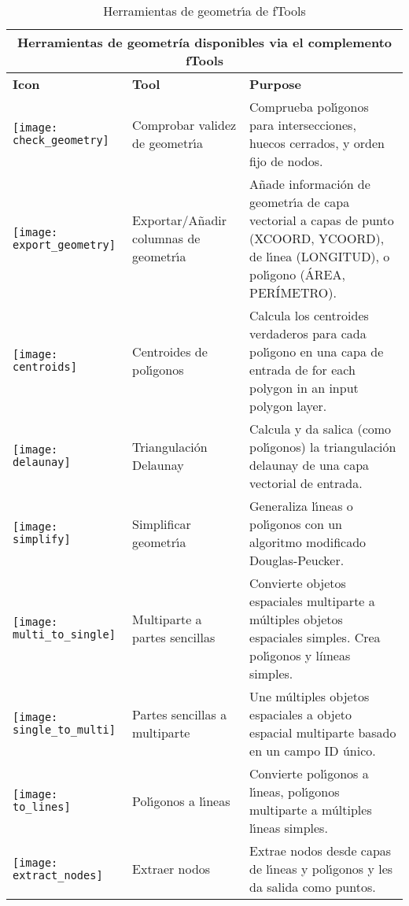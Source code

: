\begin{table}[ht]
\centering
\caption{Herramientas de geometr\'{\i}a de fTools}\label{tab:ftool_geometry}\medskip
 \begin{tabular}{|p{0.3in}|p{1.2in}|p{4.8in}|}
 \hline \multicolumn{3}{|c|}{\textbf{Herramientas de geometr\'ia disponibles via el complemento fTools}} \\
 \hline \textbf{Icon} & \textbf{Tool} & \textbf{Purpose} \\
 \hline \texttt{[image: check\_geometry]} & Comprobar validez de geometr\'{\i}a & 
Comprueba pol\'{\i}gonos para intersecciones, huecos cerrados, y orden fijo de nodos. \\
 \hline \texttt{[image: export\_geometry]} & Exportar/A\~nadir columnas de geometr\'{\i}a 
& A\~nade informaci\'on de geometr\'{\i}a de capa vectorial a capas de punto (XCOORD, YCOORD), 
de l\'{\i}nea (LONGITUD), o pol\'{\i}gono (\'AREA, PER\'IMETRO). \\
 \hline \texttt{[image: centroids]} & Centroides de pol\'{\i}gonos & 
Calcula los centroides verdaderos para cada pol\'{\i}gono en una capa de entrada de  for each polygon in an input polygon layer. \\
 \hline \texttt{[image: delaunay]} & Triangulaci\'on Delaunay & 
Calcula y da salica (como pol\'{\i}gonos) la triangulaci\'on delaunay de una capa vectorial de entrada. \\
 \hline \texttt{[image: simplify]} & Simplificar geometr\'{\i}a & 
Generaliza l\'{\i}neas o pol\'{\i}gonos con un algoritmo modificado Douglas-Peucker. \\
 \hline \texttt{[image: multi\_to\_single]} & Multiparte a 
partes sencillas & Convierte objetos espaciales multiparte a m\'ultiples objetos espaciales simples. 
Crea pol\'{\i}gonos y l\'i{\i}neas simples. \\
 \hline \texttt{[image: single\_to\_multi]} & Partes sencillas a 
multiparte & Une m\'ultiples objetos espaciales a objeto espacial multiparte basado 
en un campo ID \'unico. \\
 \hline \texttt{[image: to\_lines]} & Pol\'{\i}gonos a l\'{\i}neas 
& Convierte pol\'{\i}gonos a l\'{\i}neas, pol\'{\i}gonos multiparte a  m\'ultiples l\'{\i}neas simples. \\
 \hline \texttt{[image: extract\_nodes]} & Extraer nodos & 
Extrae nodos desde capas de l\'{\i}neas y pol\'{\i}gonos y les da salida como puntos. \\
 \hline
\end{tabular}
\end{table}

